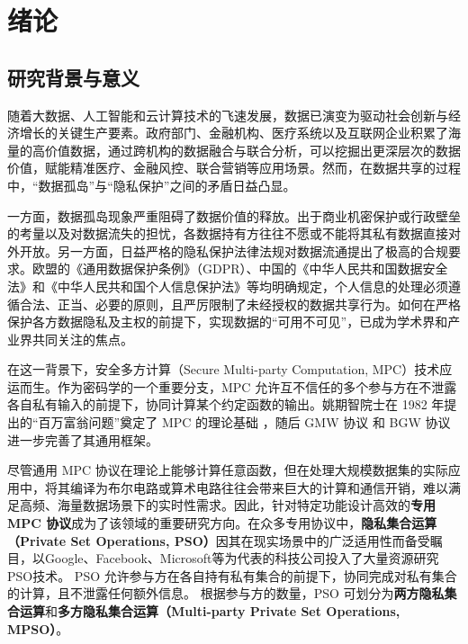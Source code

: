 \chapter{绪论}

\section{研究背景与意义}

随着大数据、人工智能和云计算技术的飞速发展，数据已演变为驱动社会创新与经济增长的关键生产要素。政府部门、金融机构、医疗系统以及互联网企业积累了海量的高价值数据，通过跨机构的数据融合与联合分析，可以挖掘出更深层次的数据价值，赋能精准医疗、金融风控、联合营销等应用场景。然而，在数据共享的过程中，“数据孤岛”与“隐私保护”之间的矛盾日益凸显。

一方面，数据孤岛现象严重阻碍了数据价值的释放。出于商业机密保护或行政壁垒的考量以及对数据流失的担忧，各数据持有方往往不愿或不能将其私有数据直接对外开放。另一方面，日益严格的隐私保护法律法规对数据流通提出了极高的合规要求。欧盟的《通用数据保护条例》（GDPR）、中国的《中华人民共和国数据安全法》和《中华人民共和国个人信息保护法》等均明确规定，个人信息的处理必须遵循合法、正当、必要的原则，且严厉限制了未经授权的数据共享行为。如何在严格保护各方数据隐私及主权的前提下，实现数据的“可用不可见”，已成为学术界和产业界共同关注的焦点。

在这一背景下，安全多方计算（Secure Multi-party Computation, MPC）技术应运而生。作为密码学的一个重要分支，MPC 允许互不信任的多个参与方在不泄露各自私有输入的前提下，协同计算某个约定函数的输出。姚期智院士在 1982 年提出的“百万富翁问题”奠定了 MPC 的理论基础 \cite{Yao-FOCS-1982}，随后 GMW 协议 \cite{GMW-STOC-1987} 和 BGW 协议 \cite{BGW-STOC-1988} 进一步完善了其通用框架。

尽管通用 MPC 协议在理论上能够计算任意函数，但在处理大规模数据集的实际应用中，将其编译为布尔电路或算术电路往往会带来巨大的计算和通信开销，难以满足高频、海量数据场景下的实时性需求。因此，针对特定功能设计高效的\textbf{专用 MPC 协议}成为了该领域的重要研究方向。在众多专用协议中，\textbf{隐私集合运算（Private Set Operations, PSO）}因其在现实场景中的广泛适用性而备受瞩目，以Google、Facebook、Microsoft等为代表的科技公司投入了大量资源研究PSO技术。
PSO 允许参与方在各自持有私有集合的前提下，协同完成对私有集合的计算，且不泄露任何额外信息。
根据参与方的数量，PSO 可划分为\textbf{两方隐私集合运算}和\textbf{多方隐私集合运算（Multi-party Private Set Operations, MPSO）}。

